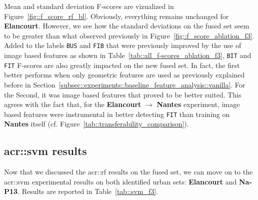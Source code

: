         Mean and standard deviation F-scores are vizualized in Figure~\ref{fig::f_score_rf_bl}.
        Obviously, everything remains unchanged for \textbf{Elancourt}.
        However, we see how the standard deviations on the fused set seem to be greater than what observed previously in Figure~\ref{fig::f_score_ablation_f3}.
        Added to the labels \texttt{BUS} and \texttt{FIB} that were previously improved by the use of image based features as shown in Table~\ref{tab::all_f-scores_ablation_f3}, \texttt{BIT} and \texttt{FIT} F-scores are also greatly impacted on the new fused set.
        In fact, the first better performs when only geometric features are used as previously explained before in Section~\ref{subsec::experiments::baseline_feature_analysis::vanilla}.
        For the Second, it was image based features that proved to be better suited.
        This agrees with the fact that, for the \textbf{Elancourt} \(\rightarrow\) \textbf{Nantes} experiment, image based features were instrumental in better detecting \texttt{FIT} than training on \textbf{Nantes} itself (cf. Figure~\ref{tab::transferability_comparison}).
        
    \subsection{\texorpdfstring{\acrshort*{acr::svm}}{SVM} results}
        \label{subsec::advanced_experiments::classifier::svm}
        Now that we discussed the \gls{acr::rf} results on the fused set, we can move on to the \gls{acr::svm} experimental results on both identified urban sets: \textbf{Elancourt} and \textbf{Na-P13}.
        Results are reported in Table~\ref{tab::svm_f3}.\\

